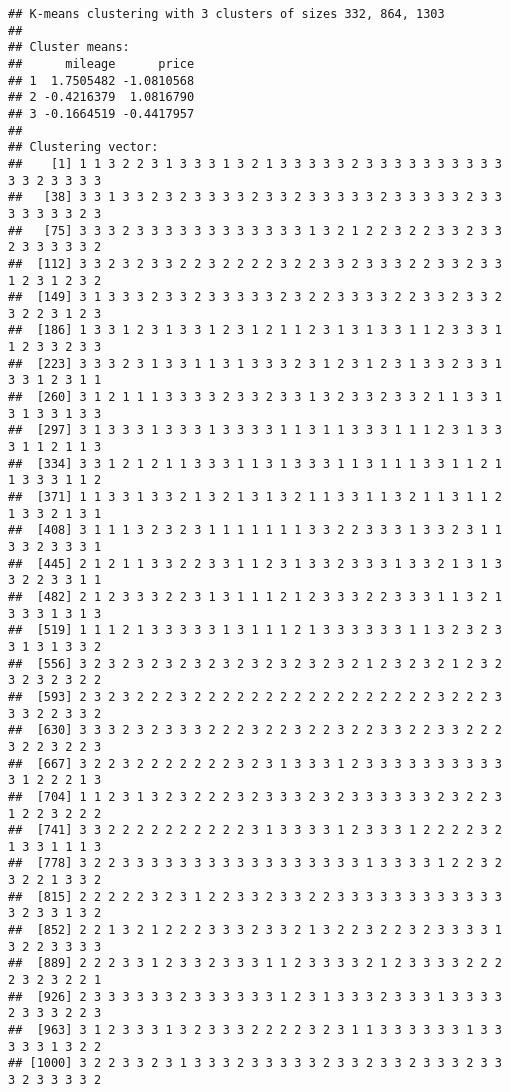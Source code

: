 \documentclass[
]{article}
\begin{document}
\begin{verbatim}
## K-means clustering with 3 clusters of sizes 332, 864, 1303
## 
## Cluster means:
##      mileage      price
## 1  1.7505482 -1.0810568
## 2 -0.4216379  1.0816790
## 3 -0.1664519 -0.4417957
## 
## Clustering vector:
##    [1] 1 1 3 2 2 3 1 3 3 3 1 3 2 1 3 3 3 3 3 2 3 3 3 3 3 3 3 3 3 3 3 3 2 3 3 3 3
##   [38] 3 3 1 3 3 2 3 2 3 3 3 3 2 3 3 2 3 3 3 3 3 2 3 3 3 3 3 2 3 3 3 3 3 3 3 2 3
##   [75] 3 3 3 2 3 3 3 3 3 3 3 3 3 3 3 3 1 3 2 1 2 2 3 2 2 3 3 2 3 3 2 3 3 3 3 3 2
##  [112] 3 3 2 3 2 3 3 2 2 3 2 2 2 2 3 2 2 3 3 2 3 3 3 2 2 3 3 2 3 3 1 2 3 1 2 3 2
##  [149] 3 1 3 3 3 2 3 3 2 3 3 3 3 3 2 3 2 2 3 3 3 3 2 2 3 3 2 3 3 2 3 2 2 3 1 2 3
##  [186] 1 3 3 1 2 3 1 3 3 1 2 3 1 2 1 1 2 3 1 3 1 3 3 1 1 2 3 3 3 1 1 2 3 3 2 3 3
##  [223] 3 3 3 2 3 1 3 3 1 1 3 1 3 3 3 2 3 1 2 3 1 2 3 1 3 3 2 3 3 1 3 3 1 2 3 1 1
##  [260] 3 1 2 1 1 1 3 3 3 3 2 3 3 2 3 3 1 3 2 3 3 2 3 3 2 1 1 3 3 1 3 1 3 3 1 3 3
##  [297] 3 1 3 3 3 1 3 3 3 1 3 3 3 3 1 1 3 1 1 3 3 3 1 1 1 2 3 1 3 3 3 1 1 2 1 1 3
##  [334] 3 3 1 2 1 2 1 1 3 3 3 1 1 3 1 3 3 3 1 1 3 1 1 1 3 3 1 1 2 1 1 3 3 3 1 1 2
##  [371] 1 1 3 3 1 3 3 2 1 3 2 1 3 1 3 2 1 1 3 3 1 1 3 2 1 1 3 1 1 2 1 3 3 2 1 3 1
##  [408] 3 1 1 1 3 2 3 2 3 1 1 1 1 1 1 1 3 3 2 2 3 3 3 1 3 3 2 3 1 1 3 3 2 3 3 3 1
##  [445] 2 1 2 1 1 3 3 2 2 3 3 1 1 2 3 1 3 3 2 3 3 3 1 3 3 2 1 3 1 3 3 2 2 3 3 1 1
##  [482] 2 1 2 3 3 3 2 2 3 1 3 1 1 1 2 1 2 3 3 3 2 2 3 3 3 1 1 3 2 1 3 3 3 1 3 1 3
##  [519] 1 1 1 2 1 3 3 3 3 3 1 3 1 1 1 2 1 3 3 3 3 3 3 1 1 3 2 3 2 3 3 1 3 1 3 3 2
##  [556] 3 2 3 2 3 2 3 2 3 2 3 2 3 2 3 2 3 2 3 2 1 2 3 2 3 2 1 2 3 2 3 2 3 2 3 2 2
##  [593] 2 3 2 3 2 2 2 3 2 2 2 2 2 2 2 2 2 2 2 2 2 2 2 2 2 3 2 2 2 3 3 3 2 2 3 3 2
##  [630] 3 3 3 2 3 2 3 3 3 2 2 2 3 2 2 3 2 2 3 2 2 3 3 2 2 3 3 2 2 2 3 2 2 3 2 2 3
##  [667] 3 2 2 3 2 2 2 2 2 2 2 3 2 3 1 3 3 3 1 2 3 3 3 3 3 3 3 3 3 3 3 1 2 2 2 1 3
##  [704] 1 1 2 3 1 3 2 3 2 2 2 3 2 3 3 3 2 3 2 3 3 3 3 3 3 2 3 2 2 3 1 2 2 3 2 2 2
##  [741] 3 3 2 2 2 2 2 2 2 2 2 2 3 1 3 3 3 3 1 2 3 3 3 1 2 2 2 2 3 2 1 3 3 1 1 1 3
##  [778] 3 2 2 3 3 3 3 3 3 3 3 3 3 3 3 3 3 3 3 3 1 3 3 3 3 1 2 2 3 2 3 2 2 1 3 3 2
##  [815] 2 2 2 2 2 3 2 3 1 2 2 3 3 2 3 3 2 2 3 3 3 3 3 3 3 3 3 3 3 3 3 2 3 3 1 3 2
##  [852] 2 2 1 3 2 1 2 2 2 3 3 3 2 3 3 2 1 3 2 2 3 2 2 3 2 3 3 3 3 1 3 2 2 3 3 3 3
##  [889] 2 2 2 3 3 1 2 3 3 2 3 3 3 1 1 2 3 3 3 3 2 1 2 3 3 3 3 2 2 2 2 3 2 3 2 2 1
##  [926] 2 3 3 3 3 3 3 2 3 3 3 3 3 3 1 2 3 1 3 3 3 2 3 3 3 1 3 3 3 3 2 3 3 3 2 2 3
##  [963] 3 1 2 3 3 3 1 3 2 3 3 3 2 2 2 2 3 2 3 1 1 3 3 3 3 3 3 1 3 3 3 3 3 1 3 2 2
## [1000] 3 2 2 3 3 2 3 1 3 3 3 2 3 3 3 3 3 2 3 3 2 3 3 2 3 3 3 2 3 3 3 2 3 3 3 3 2

\end{verbatim}
\end{document}
